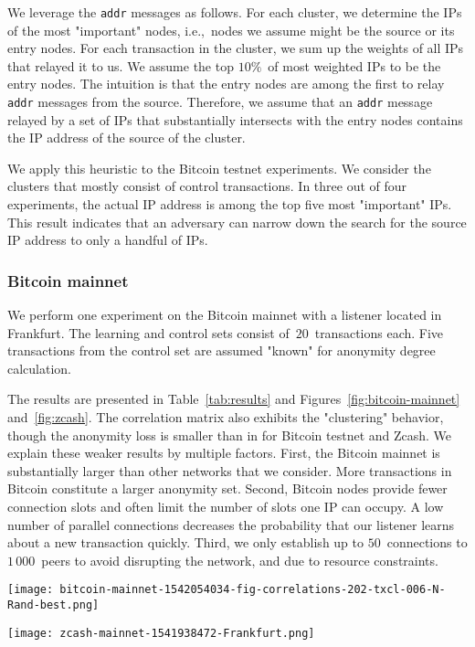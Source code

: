 We leverage the \texttt{addr} messages as follows.
For each cluster, we determine the IPs of the most "important" nodes, i.e.,~nodes we assume might be the source or its entry nodes.
For each transaction in the cluster, we sum up the weights of all IPs that relayed it to us.
We assume the top $10\%$~of most weighted IPs to be the entry nodes.
The intuition is that the entry nodes are among the first to relay \texttt{addr} messages from the source.
Therefore, we assume that an \texttt{addr} message relayed by a set of IPs that substantially intersects with the entry nodes contains the IP address of the source of the cluster.

We apply this heuristic to the Bitcoin testnet experiments.
We consider the clusters that mostly consist of control transactions.
In three out of four experiments, the actual IP address is among the top five most "important" IPs.
This result indicates that an adversary can narrow down the search for the source IP address to only a handful of IPs.

\subsubsection{Bitcoin mainnet}

We perform one experiment on the Bitcoin mainnet with a listener located in Frankfurt.
The learning and control sets consist of~$20$~transactions each.
Five transactions from the control set are assumed "known" for anonymity degree calculation.

The results are presented in Table~\ref{tab:results} and Figures~\ref{fig:bitcoin-mainnet} and~\ref{fig:zcash}.
The correlation matrix also exhibits the "clustering" behavior, though the anonymity loss is smaller than in for Bitcoin testnet and Zcash.
We explain these weaker results by multiple factors.
First, the Bitcoin mainnet is substantially larger than other networks that we consider.
More transactions in Bitcoin constitute a larger anonymity set.
Second, Bitcoin nodes provide fewer connection slots and often limit the number of slots one IP can occupy.
A low number of parallel connections decreases the probability that our listener learns about a new transaction quickly.
Third, we only establish up to $50$~connections to $1\,000$~peers to avoid disrupting the network, and due to resource constraints.

\begin{figure*}
	\centering
	\begin{minipage}{0.5\textwidth}
		\centering
		\texttt{[image: bitcoin-mainnet-1542054034-fig-correlations-202-txcl-006-N-Rand-best.png]}
		\caption{Transaction clustering for Bitcoin mainnet.}
		\label{fig:bitcoin-mainnet}
	\end{minipage}\hfill
	\begin{minipage}{0.5\textwidth}
		\centering
		\texttt{[image: zcash-mainnet-1541938472-Frankfurt.png]}
		\caption{Transaction clustering for Zcash.}
		\label{fig:zcash}
	\end{minipage}\hfill
\end{figure*}

